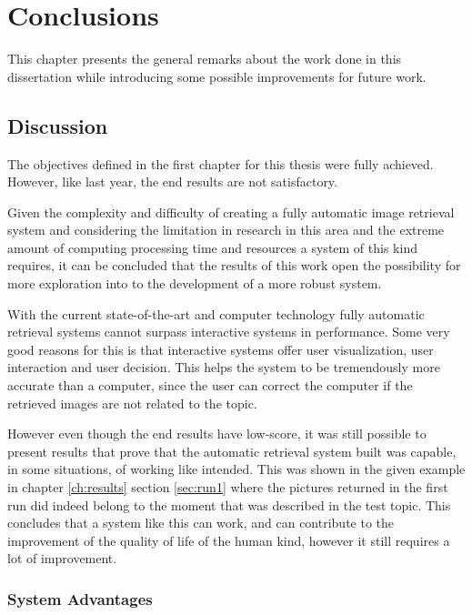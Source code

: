\cleardoublepage
\chapter{Conclusions}
\label{ch:conclusions}

This chapter presents the general remarks about the work done in this dissertation while introducing some possible improvements for future work.

\section{Discussion}

The objectives defined in the first chapter for this thesis were fully achieved. However, like last year, the end results are not satisfactory.


Given the complexity and difficulty of creating a fully automatic image retrieval system and considering the limitation in research in this area and the extreme amount of computing processing time and resources a system of this kind requires, it can be concluded that the results of this work open the possibility for more exploration into to the development of a more robust system.


With the current state-of-the-art and computer technology fully automatic retrieval systems cannot surpass interactive systems in performance. Some very good reasons for this is that interactive systems offer user visualization, user interaction and user decision. This helps the system to be tremendously more accurate than a computer, since the user can correct the computer if the retrieved images are not related to the topic.


However even though the end results have low-score, it was still possible to present results that prove that the automatic retrieval system built was capable, in some situations, of working like intended. This was shown in the given example in chapter \ref{ch:results} section \ref{sec:run1} where the pictures returned in the first run did indeed belong to the moment that was described in the test topic. This concludes that a system like this can work, and can contribute to the improvement of the quality of life of the human kind, however it still requires a lot of improvement.



\subsection{System Advantages}

